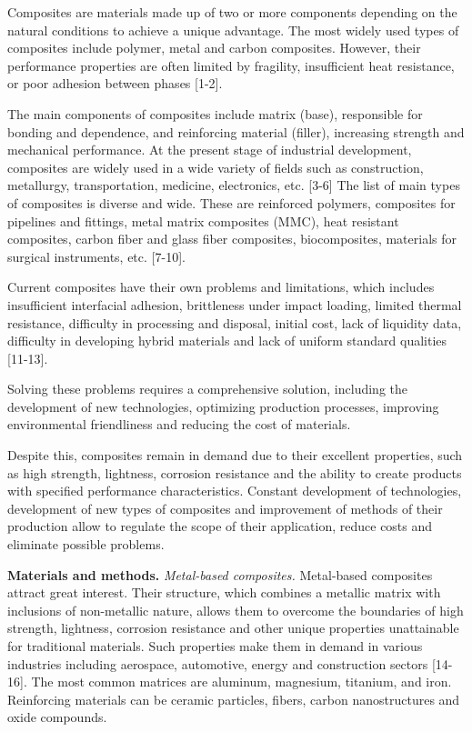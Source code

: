 Composites are materials made up of two or more components depending on
the natural conditions to achieve a unique advantage. The most widely
used types of composites include polymer, metal and carbon composites.
However, their performance properties are often limited by fragility,
insufficient heat resistance, or poor adhesion between phases {[}1-2{]}.

The main components of composites include matrix (base), responsible for
bonding and dependence, and reinforcing material (filler), increasing
strength and mechanical performance. At the present stage of industrial
development, composites are widely used in a wide variety of fields such
as construction, metallurgy, transportation, medicine, electronics, etc.
{[}3-6{]} The list of main types of composites is diverse and wide.
These are reinforced polymers, composites for pipelines and fittings,
metal matrix composites (MMC), heat resistant composites, carbon fiber
and glass fiber composites, biocomposites, materials for surgical
instruments, etc. {[}7-10{]}.

Current composites have their own problems and limitations, which
includes insufficient interfacial adhesion, brittleness under impact
loading, limited thermal resistance, difficulty in processing and
disposal, initial cost, lack of liquidity data, difficulty in developing
hybrid materials and lack of uniform standard qualities {[}11-13{]}.

Solving these problems requires a comprehensive solution, including the
development of new technologies, optimizing production processes,
improving environmental friendliness and reducing the cost of materials.

Despite this, composites remain in demand due to their excellent
properties, such as high strength, lightness, corrosion resistance and
the ability to create products with specified performance
characteristics. Constant development of technologies, development of
new types of composites and improvement of methods of their production
allow to regulate the scope of their application, reduce costs and
eliminate possible problems.

{\bfseries Materials and methods.} \emph{Metal-based composites.}
Metal-based composites attract great interest. Their structure, which
combines a metallic matrix with inclusions of non-metallic nature,
allows them to overcome the boundaries of high strength, lightness,
corrosion resistance and other unique properties unattainable for
traditional materials. Such properties make them in demand in various
industries including aerospace, automotive, energy and construction
sectors {[}14-16{]}. The most common matrices are aluminum, magnesium,
titanium, and iron. Reinforcing materials can be ceramic particles,
fibers, carbon nanostructures and oxide compounds.

